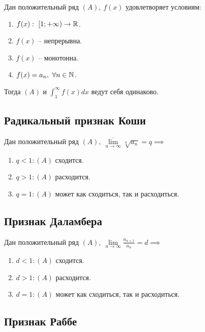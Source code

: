 \begin{theorem}
    Дан положительный ряд $ (A), \ f(x)$ удовлетворяет условиям:
    \begin{enumerate}
        \item $f(x): \ [1;+\infty) \rightarrow\mathbb{R}$.
        \item $f(x)$ -- непрерывна.
        \item $f(x)$ -- монотонна.
        \item $f(x) = a_n, \ \forall n \in \mathbb{N}$.
    \end{enumerate}

    Тогда $(A)$ и $\int_{1}^{\infty}f(x)dx$ ведут себя одинаково.
\end{theorem}

\subsection{Радикальный признак Коши}

\begin{theorem}
    Дан положительный ряд $(A), \ \underset{n\rightarrow\infty}{\overline{\lim}}\sqrt[n]{a_n} = q\implies $
    \begin{enumerate}
        \item $q < 1: (A)$ сходится.
        \item $q > 1: (A)$ расходится.
        \item $q = 1: (A)$ может как сходиться, так и расходиться.
    \end{enumerate}
\end{theorem}

\newpage

\subsection{Признак Даламбера}

\begin{theorem}
    Дан положительный ряд $(A), \ \underset{n\rightarrow\infty}{\lim}\frac{a_{n+1}}{a_n} = d \implies $
    \begin{enumerate}
        \item $d < 1:(A)$ сходится.
        \item $d > 1:(A)$ расходится.
        \item $d = 1:(A)$ может как сходиться, так и расходиться.
    \end{enumerate}
\end{theorem}

\subsection{Признак Раббе}

